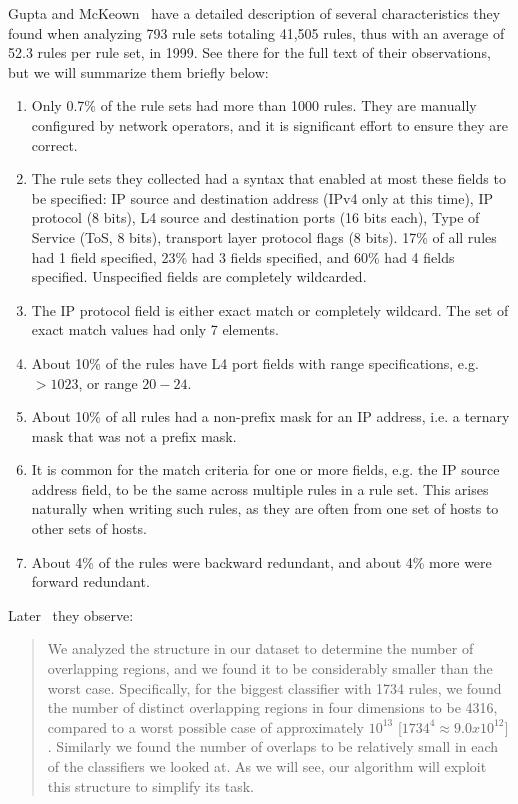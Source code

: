 \documentclass[acmsmall]{acmart}
\begin{document}
Gupta and McKeown~\cite[Sec. 2.1]{GM1999a} have a detailed description
of several characteristics they found when analyzing 793 rule sets
totaling 41,505 rules, thus with an average of 52.3 rules per rule set,
in 1999.  See there for the full text of their observations,
but we will summarize them briefly below:

\begin{enumerate}
  \item Only 0.7\% of the rule sets had more than 1000 rules.  They are manually configured by network operators, and it is significant effort to ensure they are correct.
  \item The rule sets they collected had a syntax that enabled at most these fields to be specified: IP source and destination address (IPv4 only at this time), IP protocol (8 bits), L4 source and destination ports (16 bits each), Type of Service (ToS, 8 bits), transport layer protocol flags (8 bits).  17\% of all rules had 1 field specified, 23\% had 3 fields specified, and 60\% had 4 fields specified.  Unspecified fields are completely wildcarded.
  \item The IP protocol field is either exact match or completely wildcard.  The set of exact match values had only 7 elements.
  \item About 10\% of the rules have L4 port fields with range specifications, e.g. $> 1023$, or range $20-24$.
  \item About 10\% of all rules had a non-prefix mask for an IP address, i.e. a ternary mask that was not a prefix mask.
  \item It is common for the match criteria for one or more fields, e.g. the IP source address field, to be the same across multiple rules in a rule set.  This arises naturally when writing such rules, as they are often from one set of hosts to other sets of hosts.
  \item About 4\% of the rules were backward redundant, and about 4\% more were forward redundant.
\end{enumerate}

Later~\cite[Sec 5.1]{GM1999a} they observe:
\begin{quote}
We analyzed the structure in our dataset to determine
the number of overlapping regions,
and we found it to be considerably smaller than the worst case.
Specifically, for the biggest classifier with 1734 rules,
we found the number of distinct overlapping regions in four dimensions to be 4316,
compared to a worst possible case of approximately $10^{13}$
[$1734^4 \approx 9.0 x 10^{12}]$.
Similarly we found the number of overlaps to be relatively small
in each of the classifiers we looked at.
As we will see, our algorithm will exploit this structure to simplify its task.
\end{quote}
\end{document}

